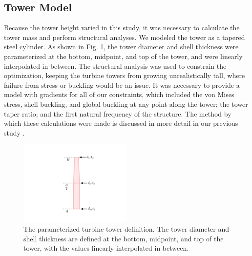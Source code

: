 \documentclass[wes, manuscript]{copernicus}
\begin{document}
	\subsection{Tower Model}
	Because the tower height varied in this study, it was necessary to calculate the tower mass and perform structural analyses.
We modeled the tower as a tapered steel cylinder. As shown in Fig. \ref{tower_def}, the tower diameter and shell thickness were parameterized at the bottom, midpoint, and top of the tower, and were linearly interpolated in between.
The structural analysis was used to constrain the optimization, keeping the turbine towers from growing unrealistically tall, where failure from stress or buckling would be an issue. 
It was necessary to provide a model with gradients for all of our constraints, which included the von Mises stress, shell buckling, and global buckling at any point along the tower; the tower taper ratio; and the first natural frequency of the structure. The method by which these calculations were made is discussed in more detail in our previous study \citep{stanley2018}.

\begin{figure}[htbp]
  \centering
  \includegraphics[width=0.5\textwidth]{Figures/tower_param.pdf}
  \caption{\label{tower_def} The parameterized turbine tower definition. The tower diameter and shell thickness are defined at the bottom, midpoint, and top of the tower, with the values linearly interpolated in between.}
\end{figure}
\end{document}
